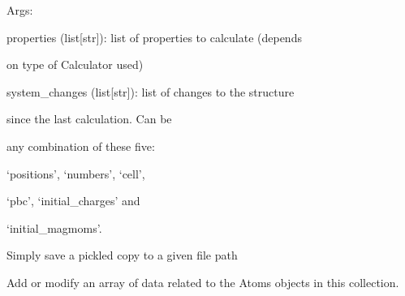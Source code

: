 \documentclass[letterpaper,10pt,english]{sphinxmanual}
\begin{document}
\begin{fulllineitems}
\begin{fulllineitems}
\begin{DUlineblock}{0em}
\item[] Args:
\item[]
\begin{DUlineblock}{\DUlineblockindent}
\item[] properties (list{[}str{]}): list of properties to calculate (depends
\item[]
\begin{DUlineblock}{\DUlineblockindent}
\item[] on type of Calculator used)
\end{DUlineblock}
\item[] system\_changes (list{[}str{]}): list of changes to the structure
\item[]
\begin{DUlineblock}{\DUlineblockindent}
\item[] since the last calculation. Can be
\item[] any combination of these five:
\item[] `positions', `numbers', `cell',
\item[] `pbc', `initial\_charges' and
\item[] `initial\_magmoms'.
\end{DUlineblock}
\end{DUlineblock}
\end{DUlineblock}

\end{fulllineitems}


\begin{fulllineitems}
\label{doctree/soprano.collection.collection:soprano.collection.collection.AtomsCollection.save}
Simply save a pickled copy to a given file path

\end{fulllineitems}


\begin{fulllineitems}
\label{doctree/soprano.collection.collection:soprano.collection.collection.AtomsCollection.set_array}
Add or modify an array of data related to the Atoms objects
in this collection.


\end{fulllineitems}
\end{fulllineitems}
\end{document}
